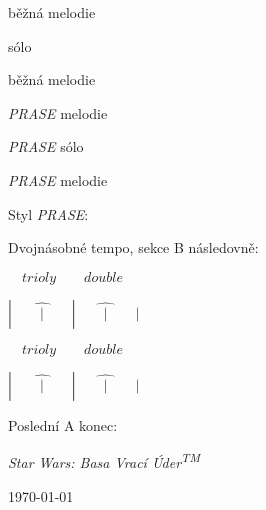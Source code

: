 \documentclass[timestamp]{jazzgrid}
\begin{document}
\begin{multicols*}{2}
	\begin{description}[noitemsep,align=right,labelwidth=\widthof{\bfseries{\scriptsize AABA}}]
	\scriptsize
	\item [Intro]
	\item [AABA] běžná melodie
	\item [AA\phantom{BA}] sólo
	\item [BA] běžná melodie
	\item [A\phantom{ABA}] \emph{PRASE} melodie
	\item [AA\phantom{BA}] \emph{PRASE} sólo
	\item [ABA] \emph{PRASE} melodie
\end{description}
\vfill\null
\columnbreak

\scriptsize
\raggedright
Styl \emph{PRASE}:

Dvojnásobné tempo, sekce B následovně:

$\quad trioly\qquad double$

$|\widehat{\qquad|\qquad}|\widehat{\qquad|\qquad}|$

$\quad trioly\qquad double$

$|\widehat{\qquad|\qquad}|\widehat{\qquad|\qquad}|$


Poslední A konec:

\emph{Star Wars: Basa Vrací Úder\textsuperscript{TM}}


\today
\end{multicols*}
\end{document}
